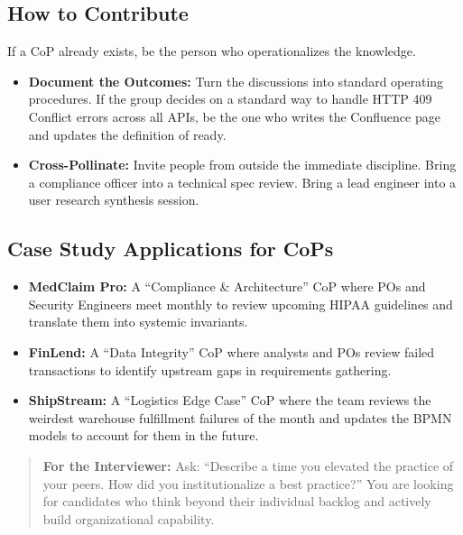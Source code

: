 \subsection{How to Contribute}\label{how-to-contribute}

If a CoP already exists, be the person who operationalizes the
knowledge.

\begin{itemize}
\tightlist
\item
  \textbf{Document the Outcomes:} Turn the discussions into standard
  operating procedures. If the group decides on a standard way to handle
  HTTP 409 Conflict errors across all APIs, be the one who writes the
  Confluence page and updates the definition of ready.
\item
  \textbf{Cross-Pollinate:} Invite people from outside the immediate
  discipline. Bring a compliance officer into a technical spec review.
  Bring a lead engineer into a user research synthesis session.
\end{itemize}

\subsection{Case Study Applications for
CoPs}\label{case-study-applications-for-cops}

\begin{itemize}
\tightlist
\item
  \textbf{MedClaim Pro:} A ``Compliance \& Architecture'' CoP where POs
  and Security Engineers meet monthly to review upcoming HIPAA
  guidelines and translate them into systemic invariants.
\item
  \textbf{FinLend:} A ``Data Integrity'' CoP where analysts and POs
  review failed transactions to identify upstream gaps in requirements
  gathering.
\item
  \textbf{ShipStream:} A ``Logistics Edge Case'' CoP where the team
  reviews the weirdest warehouse fulfillment failures of the month and
  updates the BPMN models to account for them in the future.
\end{itemize}

\begin{quote}
\textbf{For the Interviewer:} Ask: ``Describe a time you elevated the
practice of your peers. How did you institutionalize a best practice?''
You are looking for candidates who think beyond their individual backlog
and actively build organizational capability.
\end{quote}

